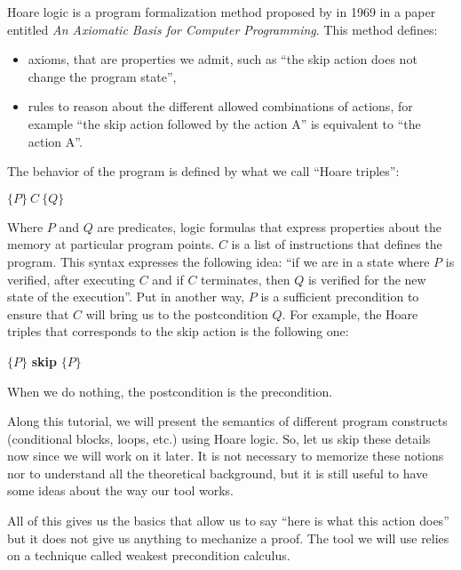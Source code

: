 Hoare logic is a program formalization method proposed by
in 1969 in a paper entitled \emph{An Axiomatic Basis for Computer
Programming}. This method defines:
\begin{itemize}
\item   axioms, that are properties we admit, such as ``the skip action does
  not change the program state'',
\item   rules to reason about the different allowed combinations of actions,
  for example ``the skip action followed by the action A'' is equivalent
  to ``the action A''.
\end{itemize}


The behavior of the program is defined by what we call ``Hoare
triples'':




\begin{center}
$\{P\}\ C\ \{Q\}$
\end{center}


Where $P$ and $Q$ are predicates, logic formulas that express
properties about the memory at particular program points. $C$ is a
list of instructions that defines the program. This syntax expresses the
following idea: ``if we are in a state where $P$ is verified, after
executing $C$ and if $C$ terminates, then $Q$ is verified for the
new state of the execution''. Put in another way, $P$ is a sufficient
precondition to ensure that $C$ will bring us to the postcondition
$Q$. For example, the Hoare triples that corresponds to the skip
action is the following one:




\begin{center}
$\{P\}$ \textbf{skip} $\{P\}$
\end{center}


When we do nothing, the postcondition is the precondition.



Along this tutorial, we will present the semantics of different program
constructs (conditional blocks, loops, etc.) using Hoare logic. So,
let us skip these details now since we will work on it later. It is
not necessary to memorize these notions nor to understand all the
theoretical background, but it is still useful to have some ideas about
the way our tool works.



All of this gives us the basics that allow us to say ``here is what
this action does'' but it does not give us anything to mechanize a
proof. The tool we will use relies on a technique called weakest
precondition calculus.



